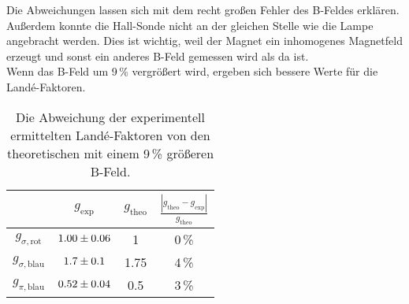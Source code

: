 Die Abweichungen lassen sich mit dem recht großen Fehler des B-Feldes erklären. Außerdem konnte die Hall-Sonde nicht an der gleichen Stelle wie die Lampe angebracht werden. Dies ist wichtig, weil der Magnet ein inhomogenes Magnetfeld erzeugt und sonst ein anderes B-Feld gemessen wird als da ist. \\
Wenn das B-Feld um 9\,\% vergrößert wird, ergeben sich bessere Werte für die Landé-Faktoren.

\begin{table}[H]
   \centering
   \caption{Die Abweichung der experimentell ermittelten Landé-Faktoren von den theoretischen mit einem 9\,\% größeren B-Feld.}
   \label{tab:}
   \begin{tabular}{c|c|c|c}
     & $g_\text{exp}$ & $g_\text{theo}$ & $\frac{|g_\text{theo} - g_\text{exp}|}{g_\text{theo}}$ \\
     \hline
     $g_{\sigma,\text{rot}}$  & $\num{1.00 +- 0.06}$ & 1 & 0\,\% \\
     $g_{\sigma,\text{blau}}$ & $\num{1.7 +- 0.1}$   & 1.75 & 4\,\% \\
     $g_{\pi,\text{blau}}$    & $\num{0.52 +- 0.04}$ & 0.5 & 3\,\% \\
   \end{tabular}
\end{table}
